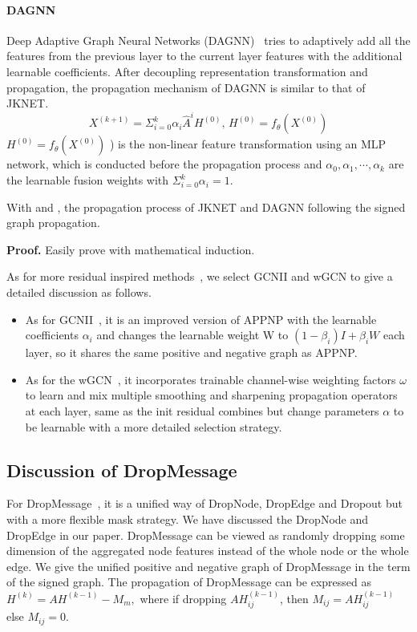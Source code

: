 \paragraph{DAGNN}
Deep Adaptive Graph Neural Networks (DAGNN)~\citep{dagnn} tries to adaptively add all the features from the previous layer to the current layer features with the additional learnable coefficients. 
After decoupling representation transformation and propagation, the propagation mechanism of DAGNN is similar to that of JKNET.
\begin{equation}
    \label{eq:dagnn}
         X^{(k+1)} = \Sigma_{i=0}^k\alpha_i \hat{A}^i H^{(0)}, \,H^{(0)}=f_\theta(X^{(0)})
\end{equation}
$ H^{(0)}=f_\theta(X^{(0)})$ ) is the non-linear feature transformation using an MLP
network, which is conducted before the propagation process and $\alpha_0, \alpha_1, \cdots, \alpha_{k}$ are the learnable fusion weights with $\Sigma_{i=0}^k\alpha_i=1$. 
\begin{theorem}
    With  and , the propagation process of JKNET and DAGNN following the signed graph propagation.
\end{theorem}
\textbf{Proof.}
Easily prove with mathematical induction.

As for more residual inspired methods~\citep{GCNII,wGCN,ACM-GCN,PDE-GCN}, we select GCNII and wGCN to give a detailed discussion as follows.
\begin{itemize}
    \item As for GCNII~\citep{GCNII}, it is an improved version of APPNP with the learnable coefficients $\alpha_i$ and changes the learnable weight W to $(1-\beta_i)I+\beta_i W$ each layer, so it shares the same positive and negative graph as APPNP.
    \item As for the wGCN~\citep{wGCN}, it incorporates trainable channel-wise weighting factors $\omega$ to learn and mix multiple smoothing and sharpening propagation operators at each layer, same as the init residual combines but change parameters $\alpha$ to be learnable with a more detailed selection strategy.
\end{itemize}


\subsection{Discussion of DropMessage}
For DropMessage~\citep{Fang2022DropMessageUR}, it is a unified way of DropNode, DropEdge and Dropout but with a more flexible mask strategy. We have discussed the DropNode and DropEdge in our paper. DropMessage can be viewed as randomly dropping some dimension of the aggregated node features instead of the whole node or the whole edge. 
We give the unified positive and negative graph of DropMessage in the term of the signed graph.
The propagation of DropMessage can be expressed as $H^{(k)}= AH^{(k-1)}-M_m,$ where if dropping $AH^{(k-1)}_{ij}$, then $M_{ij}=AH^{(k-1)}_{ij}$ else $M_{ij}=0$.







